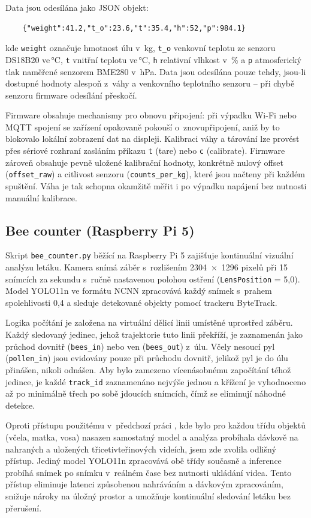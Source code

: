 Data jsou odesílána jako JSON objekt:
\begin{verbatim}
    {"weight":41.2,"t_o":23.6,"t":35.4,"h":52,"p":984.1}
\end{verbatim}
kde \texttt{weight} označuje hmotnost úlu v~kg, \texttt{t\_o} venkovní teplotu ze senzoru DS18B20 ve\,°C, \texttt{t} vnitřní teplotu ve\,°C, \texttt{h} relativní vlhkost v~\% a \texttt{p} atmosferický tlak naměřené senzorem BME280 v~hPa. Data jsou odesílána pouze tehdy, jsou-li dostupné hodnoty alespoň z~váhy a venkovního teplotního senzoru -- při chybě senzoru firmware odesílání přeskočí.

Firmware obsahuje mechanismy pro obnovu připojení: při výpadku Wi-Fi nebo MQTT spojení se zařízení opakovaně pokouší o~znovupřipojení, aniž by to blokovalo lokální zobrazení dat na displeji. Kalibraci váhy a tárování lze provést přes sériové rozhraní zasláním příkazu \texttt{t} (tare) nebo \texttt{c} (calibrate). Firmware zároveň obsahuje pevně uložené kalibrační hodnoty, konkrétně nulový offset (\texttt{offset\_raw}) a citlivost senzoru (\texttt{counts\_per\_kg}), které jsou načteny při každém spuštění. Váha je tak schopna okamžitě měřit i po výpadku napájení bez nutnosti manuální kalibrace.

\subsection*{Bee counter (Raspberry Pi 5)}
Skript \texttt{bee\_counter.py} běžící na Raspberry Pi 5 zajišťuje kontinuální vizuální analýzu letáku. Kamera snímá záběr s~rozlišením 2304~$\times$~1296 pixelů při 15 snímcích za sekundu s~ručně nastavenou polohou ostření (\texttt{LensPosition} = 5,0). Model YOLO11n ve formátu NCNN zpracovává každý snímek s~prahem spolehlivosti 0,4 a sleduje detekované objekty pomocí trackeru ByteTrack.

Logika počítání je založena na virtuální dělicí linii umístěné uprostřed záběru. Každý sledovaný jedinec, jehož trajektorie tuto linii překříží, je zaznamenán jako průchod dovnitř (\texttt{bees\_in}) nebo ven (\texttt{bees\_out}) z~úlu. Včely nesoucí pyl (\texttt{pollen\_in}) jsou evidovány pouze při průchodu dovnitř, jelikož pyl je do úlu přinášen, nikoli odnášen. Aby bylo zamezeno vícenásobnému započítání téhož jedince, je každé \texttt{track\_id} zaznamenáno nejvýše jednou a křížení je vyhodnoceno až po minimálně třech po sobě jdoucích snímcích, čímž se eliminují náhodné detekce.

Oproti přístupu použitému v~předchozí práci \cite{Chovancova2025}, kde bylo pro každou třídu objektů (včela, matka, vosa) nasazen samostatný model a analýza probíhala dávkově na nahraných a uložených třicetivteřinových videích, jsem zde zvolila odlišný přístup. Jediný model YOLO11n zpracovává obě třídy současně a inference probíhá snímek po snímku v~reálném čase bez nutnosti ukládání videa. Tento přístup eliminuje latenci způsobenou nahráváním a dávkovým zpracováním, snižuje nároky na úložný prostor a umožňuje kontinuální sledování letáku bez přerušení.

